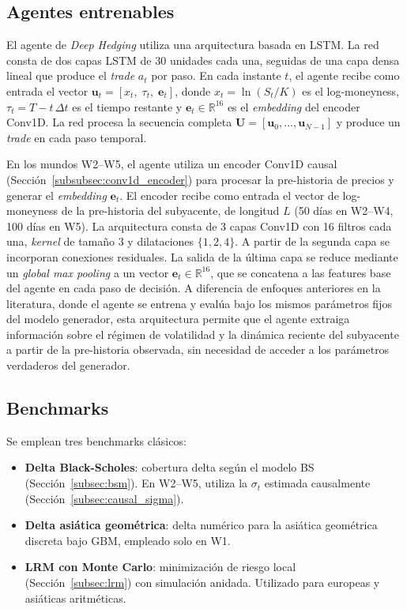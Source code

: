 \documentclass[11pt,a4paper,spanish]{article}
\numberwithin{equation}{section} %
\begin{document}
\subsection{Agentes entrenables}

El agente de \textit{Deep Hedging} utiliza una arquitectura basada en LSTM. La red consta de dos capas LSTM de 30 unidades cada una, seguidas de una capa densa lineal que produce el \textit{trade} $a_t$ por paso. En cada instante $t$, el agente recibe como entrada el vector $\mathbf{u}_t = [x_t,\; \tau_t,\; \mathbf{e}_t]$, donde $x_t = \ln(S_t / K)$ es el log-moneyness, $\tau_t = T - t\,\Delta t$ es el tiempo restante y $\mathbf{e}_t \in \mathbb{R}^{16}$ es el \textit{embedding} del encoder Conv1D. La red procesa la secuencia completa $\mathbf{U} = [\mathbf{u}_0, \ldots, \mathbf{u}_{N-1}]$ y produce un \textit{trade} en cada paso temporal.

En los mundos W2--W5, el agente utiliza un encoder Conv1D causal (Sección~\ref{subsubsec:conv1d_encoder}) para procesar la pre-historia de precios y generar el \textit{embedding} $\mathbf{e}_t$. El encoder recibe como entrada el vector de log-moneyness de la pre-historia del subyacente, de longitud $L$ (50 días en W2--W4, 100 días en W5). La arquitectura consta de 3 capas Conv1D con 16 filtros cada una, \textit{kernel} de tamaño 3 y dilataciones $\{1, 2, 4\}$. A partir de la segunda capa se incorporan conexiones residuales. La salida de la última capa se reduce mediante un \textit{global max pooling} a un vector $\mathbf{e}_t \in \mathbb{R}^{16}$, que se concatena a las features base del agente en cada paso de decisión. A diferencia de enfoques anteriores en la literatura, donde el agente se entrena y evalúa bajo los mismos parámetros fijos del modelo generador, esta arquitectura permite que el agente extraiga información sobre el régimen de volatilidad y la dinámica reciente del subyacente a partir de la pre-historia observada, sin necesidad de acceder a los parámetros verdaderos del generador.

\subsection{Benchmarks}

Se emplean tres benchmarks clásicos:

\begin{itemize}
    \item \textbf{Delta Black-Scholes}: cobertura delta según el modelo BS (Sección~\ref{subsec:bsm}). En W2--W5, utiliza la $\sigma_t$ estimada causalmente (Sección~\ref{subsec:causal_sigma}).
    \item \textbf{Delta asiática geométrica}: delta numérico para la asiática geométrica discreta bajo GBM, empleado solo en W1.
    \item \textbf{LRM con Monte Carlo}: minimización de riesgo local (Sección~\ref{subsec:lrm}) con simulación anidada. Utilizado para europeas y asiáticas aritméticas.
\end{itemize}
\end{document}
